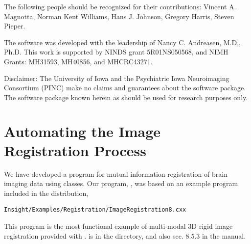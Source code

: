 \documentclass{InsightArticle}
\begin{document}
The following people should be recognized for
their contributions: Vincent A. Magnotta, Norman Kent Williams, 
Hans J. Johnson, Gregory Harris, Steven Pieper.
\vspace{0.25in}\par
The \brainstwoprog{} software was developed with the leadership of
Nancy C. Andreasen, M.D., Ph.D.
This work is supported by NINDS grant 5R01NS050568, and NIMH Grants:
MH31593, MH40856, and MHCRC43271.

Disclaimer: The University of Iowa and the Psychiatric Iowa Neuroimaging 
Consortium (PINC) make no
claims and guarantees about the \miregprog{} software package. The software
package known herein as \miregprog{} should be used for research purposes only.

\tableofcontents

\section{Automating the Image Registration Process}

We have developed a program for mutual information registration 
of brain imaging data
using  \cite{ibanez:ITKSoftwareGuide14} classes.
Our program, \miregprog{}, was based on an example program included in
the  distribution,
\begin{verbatim}
Insight/Examples/Registration/ImageRegistration8.cxx
\end{verbatim}
This program is the most functional example of multi-modal
3D rigid image registration provided with .
 is in the  directory, 
and also sec. 8.5.3 in the  manual.
\end{document}
